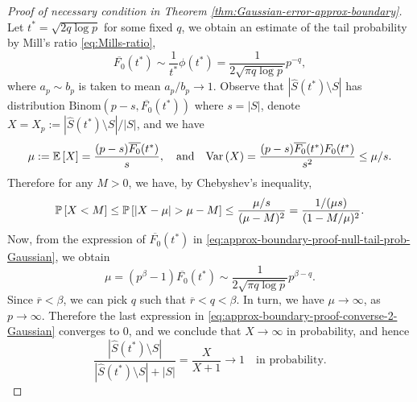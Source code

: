 \begin{proof}[Proof of necessary condition in Theorem \ref{thm:Gaussian-error-approx-boundary}]
Let $t^* = \sqrt{2q\log{p}}$ for some fixed $q$, we obtain an estimate of the tail probability by Mill's ratio \eqref{eq:Mills-ratio}, 
\begin{equation}
    \overline{F_0}(t^*) 
    \sim \frac{1}{t^*}\phi(t^*)
    = \frac{1}{2\sqrt{\pi q\log{p}}} p^{-q}, \label{eq:approx-boundary-proof-null-tail-prob-Gaussian}
\end{equation}
where $a_p\sim b_p$ is taken to mean $a_p/b_p\to 1$.
Observe that $|\widehat{S}(t^*)\setminus{S}|$ has distribution $\text{Binom}(p-s, \overline{F_0}(t^*))$ where $s=|S|$, denote $X = X_p := {|\widehat{S}(t^*)\setminus{S}|}/{|S|}$, and we have 
$$
\mu := \E\left[X\right] = \frac{(p-s)\overline{F_0}(t^*)}{s},
\quad \text{and} \quad
\var\left(X\right) = \frac{(p-s)\overline{F_0}(t^*){F_0}(t^*)}{s^2} \le \mu/s.
$$
Therefore for any $M>0$, we have, by Chebyshev's inequality,
\begin{equation}
    \P\left[X < M\right] 
    \le \P\left[\left|X-\mu\right| > \mu - M\right]
    \le \frac{\mu/s}{(\mu-M)^2}
    = \frac{1/(\mu s)}{(1-M/\mu)^2}. \label{eq:approx-boundary-proof-converse-2-Gaussian}
\end{equation}
Now, from the expression of $\overline{F_0}(t^*)$ in \eqref{eq:approx-boundary-proof-null-tail-prob-Gaussian}, we obtain
$$
\mu = (p^\beta - 1)\overline{F_0}(t^*) \sim \frac{1}{2\sqrt{\pi q\log{p}}} p^{\beta-q}.
$$
Since $\overline{r}<\beta$, we can pick $q$ such that $\overline{r}<q<\beta$. 
In turn, we have $\mu \to\infty$, as $p\to\infty$.
Therefore the last expression in \eqref{eq:approx-boundary-proof-converse-2-Gaussian} converges to 0, and we conclude that $X\to\infty$ in probability, and hence
\begin{equation} \label{eq:approx-boundary-proof-converse-3-Gaussian}
\frac{|\widehat{S}(t^*)\setminus{S}|}{|\widehat{S}(t^*)\setminus{S}|+|{S}|} 
= \frac{X}{X+1} \to 1 \quad \text{in probability}.
\end{equation}


\end{proof}
